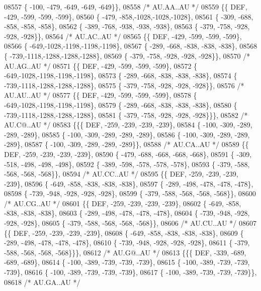 \begin{DoxyCode}
08557 \{ -100, -479, -649, -649, -649\}\},
08558 \textcolor{comment}{/* AU.AA..AU */}
08559 \{\{  DEF, -429, -599, -599, -599\},
08560 \{ -479, -858,-1028,-1028,-1028\},
08561 \{ -309, -688, -858, -858, -858\},
08562 \{ -389, -768, -938, -938, -938\},
08563 \{ -379, -758, -928, -928, -928\}\},
08564 \textcolor{comment}{/* AU.AC..AU */}
08565 \{\{  DEF, -429, -599, -599, -599\},
08566 \{ -649,-1028,-1198,-1198,-1198\},
08567 \{ -289, -668, -838, -838, -838\},
08568 \{ -739,-1118,-1288,-1288,-1288\},
08569 \{ -379, -758, -928, -928, -928\}\},
08570 \textcolor{comment}{/* AU.AG..AU */}
08571 \{\{  DEF, -429, -599, -599, -599\},
08572 \{ -649,-1028,-1198,-1198,-1198\},
08573 \{ -289, -668, -838, -838, -838\},
08574 \{ -739,-1118,-1288,-1288,-1288\},
08575 \{ -379, -758, -928, -928, -928\}\},
08576 \textcolor{comment}{/* AU.AU..AU */}
08577 \{\{  DEF, -429, -599, -599, -599\},
08578 \{ -649,-1028,-1198,-1198,-1198\},
08579 \{ -289, -668, -838, -838, -838\},
08580 \{ -739,-1118,-1288,-1288,-1288\},
08581 \{ -379, -758, -928, -928, -928\}\}\},
08582 \textcolor{comment}{/* AU.C@..AU */}
08583 \{\{\{  DEF, -259, -239, -239, -239\},
08584 \{ -100, -309, -289, -289, -289\},
08585 \{ -100, -309, -289, -289, -289\},
08586 \{ -100, -309, -289, -289, -289\},
08587 \{ -100, -309, -289, -289, -289\}\},
08588 \textcolor{comment}{/* AU.CA..AU */}
08589 \{\{  DEF, -259, -239, -239, -239\},
08590 \{ -479, -688, -668, -668, -668\},
08591 \{ -309, -518, -498, -498, -498\},
08592 \{ -389, -598, -578, -578, -578\},
08593 \{ -379, -588, -568, -568, -568\}\},
08594 \textcolor{comment}{/* AU.CC..AU */}
08595 \{\{  DEF, -259, -239, -239, -239\},
08596 \{ -649, -858, -838, -838, -838\},
08597 \{ -289, -498, -478, -478, -478\},
08598 \{ -739, -948, -928, -928, -928\},
08599 \{ -379, -588, -568, -568, -568\}\},
08600 \textcolor{comment}{/* AU.CG..AU */}
08601 \{\{  DEF, -259, -239, -239, -239\},
08602 \{ -649, -858, -838, -838, -838\},
08603 \{ -289, -498, -478, -478, -478\},
08604 \{ -739, -948, -928, -928, -928\},
08605 \{ -379, -588, -568, -568, -568\}\},
08606 \textcolor{comment}{/* AU.CU..AU */}
08607 \{\{  DEF, -259, -239, -239, -239\},
08608 \{ -649, -858, -838, -838, -838\},
08609 \{ -289, -498, -478, -478, -478\},
08610 \{ -739, -948, -928, -928, -928\},
08611 \{ -379, -588, -568, -568, -568\}\}\},
08612 \textcolor{comment}{/* AU.G@..AU */}
08613 \{\{\{  DEF, -339, -689, -689, -689\},
08614 \{ -100, -389, -739, -739, -739\},
08615 \{ -100, -389, -739, -739, -739\},
08616 \{ -100, -389, -739, -739, -739\},
08617 \{ -100, -389, -739, -739, -739\}\},
08618 \textcolor{comment}{/* AU.GA..AU */}

\end{DoxyCode}
